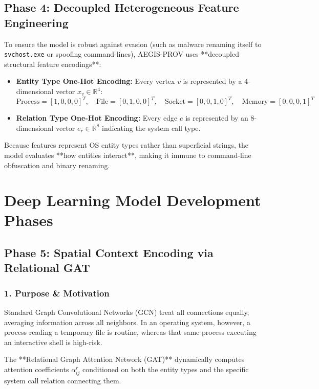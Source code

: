 \documentclass[11pt,a4paper]{report}
\begin{document}
\section{Phase 4: Decoupled Heterogeneous Feature Engineering}
To ensure the model is robust against evasion (such as malware renaming itself to \texttt{svchost.exe} or spoofing command-lines), AEGIS-PROV uses **decoupled structural feature encodings**:
\begin{itemize}
    \item \textbf{Entity Type One-Hot Encoding:} Every vertex $v$ is represented by a 4-dimensional vector $x_v \in \mathbb{R}^4$:
    $$\text{Process} = [1, 0, 0, 0]^T, \quad \text{File} = [0, 1, 0, 0]^T, \quad \text{Socket} = [0, 0, 1, 0]^T, \quad \text{Memory} = [0, 0, 0, 1]^T$$
    \item \textbf{Relation Type One-Hot Encoding:} Every edge $e$ is represented by an 8-dimensional vector $e_r \in \mathbb{R}^8$ indicating the system call type.
\end{itemize}
Because features represent OS entity types rather than superficial strings, the model evaluates **how entities interact**, making it immune to command-line obfuscation and binary renaming.

\chapter{Deep Learning Model Development Phases}

\section{Phase 5: Spatial Context Encoding via Relational GAT}

\subsection{1. Purpose \& Motivation}
Standard Graph Convolutional Networks (GCN) treat all connections equally, averaging information across all neighbors. In an operating system, however, a process reading a temporary file is routine, whereas that same process executing an interactive shell is high-risk. 

The **Relational Graph Attention Network (GAT)** dynamically computes attention coefficients $\alpha_{ij}^r$ conditioned on both the entity types and the specific system call relation connecting them.
\end{document}
